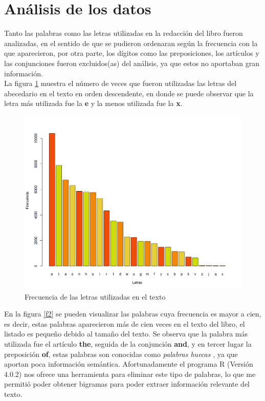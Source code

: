 \documentclass[spanish,notitlepage,letterpaper, 12pt]{article} %
\begin{document}
\section{Análisis de los datos}

Tanto las palabras como las letras utilizadas en la redacción del libro fueron analizadas, en el sentido de que se pudieron ordenaran según la frecuencia con la que aparecieron, por otra parte, los dígitos como las preposiciones, los artículos y las conjunciones fueron excluidos(as) del análisis, ya que estos no aportaban gran información.\\

La figura \ref{f1} muestra el número de veces que fueron utilizadas las letras del abecedario en el texto en orden descendente, en donde se puede  observar que la letra más utilizada fue la \textbf{e} y la menos utilizada fue la \textbf{x}. \\

\begin{figure}[]
\begin{center}
\includegraphics[width=16 cm]{FigModeloReporte/T2_letras.png}
\caption{Frecuencia de las letras utilizadas en el texto}\label{f1}
\end{center}
\end{figure}

En la figura \ref{f2} se pueden visualizar las palabras cuya frecuencia es mayor a cien, es decir, estas palabras aparecieron más de cien veces en el texto del libro, el listado es pequeño debido al tamaño del texto. Se observa que la palabra más utilizada fue el artículo \textbf{the}, seguida de la conjunción \textbf{and}, y en tercer lugar la preposición \textbf{of}, estas palabras son conocidas como \emph{palabras huecas} \cite{mendoza2018}, ya que aportan poca información semántica. Afortunadamente el programa R (Versión 4.0.2) \cite{LenguajeR} nos ofrece una herramienta para eliminar este tipo de palabras, lo que me permitió poder obtener bigramas para poder extraer información relevante del texto.\\
\end{document}
